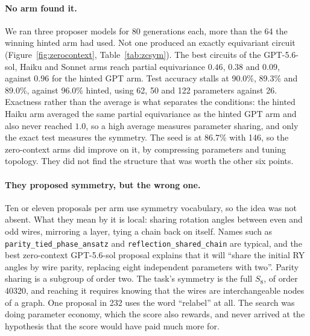 \documentclass[11pt]{article}
\begin{document}
\paragraph{No arm found it.}
We ran three proposer models for 80 generations each, more than the 64 the
winning hinted arm had used. Not one produced an exactly equivariant circuit
(Figure~\ref{fig:zerocontext}, Table~\ref{tab:zcsym}). The best circuits of the
GPT-5.6-sol, Haiku and Sonnet arms reach partial equivariance $0.46$, $0.38$ and
$0.09$, against $0.96$ for the hinted GPT arm. Test accuracy stalls at 90.0\%,
89.3\% and 89.0\%, against 96.0\% hinted, using 62, 50 and 122 parameters against
26. Exactness rather than the average is what separates the conditions: the
hinted Haiku arm averaged the same partial equivariance as the hinted GPT arm and
also never reached $1.0$, so a high average measures parameter sharing, and only
the exact test measures the symmetry. The seed is at 86.7\% with 146, so the
zero-context arms did improve on it, by compressing parameters and tuning
topology. They did not find the structure that was worth the other six points.

\paragraph{They proposed symmetry, but the wrong one.}
Ten or eleven proposals per arm use symmetry vocabulary, so the idea was not
absent. What they mean by it is local: sharing rotation angles between even and
odd wires, mirroring a layer, tying a chain back on itself. Names such as
\texttt{parity\_tied\_phase\_ansatz} and \texttt{reflection\_shared\_chain} are
typical, and the best zero-context GPT-5.6-sol proposal explains that it will
``share the initial RY angles by wire parity, replacing eight independent
parameters with two''. Parity sharing is a subgroup of order two. The task's
symmetry is the full $S_8$, of order 40320, and reaching it requires knowing that
the wires are interchangeable nodes of a graph. One proposal in 232 uses the word
``relabel'' at all. The search was doing parameter economy, which the score also
rewards, and never arrived at the hypothesis that the score would have paid much
more for.
\end{document}
